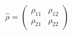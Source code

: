 \documentclass[preview]{standalone}
\begin{document}
\begin{align*}
\hat{\rho} = \begin{pmatrix} \rho_{11} & \rho_{12} \\ \rho_{21} & \rho_{22} \end{pmatrix}
\end{align*}
\end{document}
